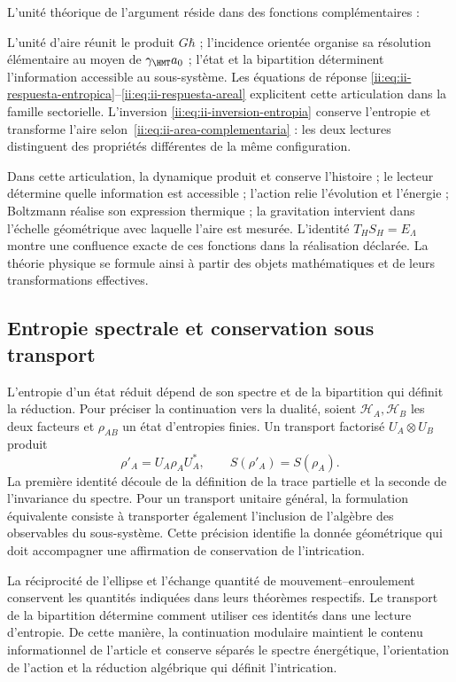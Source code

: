 L’unité théorique de l’argument réside dans des fonctions complémentaires :

L’unité d’aire réunit le produit $G\hbar$ ; l’incidence orientée
organise sa résolution élémentaire au moyen de $\gamma_{\HMT}a_0$ ;
l’état et la bipartition déterminent l’information accessible au
sous-système. Les équations de réponse
\eqref{ii:eq:ii-respuesta-entropica}--\eqref{ii:eq:ii-respuesta-areal}
explicitent cette articulation dans la famille sectorielle. L’inversion
\eqref{ii:eq:ii-inversion-entropia} conserve l’entropie et transforme
l’aire selon~\eqref{ii:eq:ii-area-complementaria} : les deux lectures
distinguent des propriétés différentes de la même configuration.

Dans cette articulation,
la dynamique produit et conserve l’histoire ; le lecteur détermine quelle
information est accessible ; l’action relie l’évolution et l’énergie ;
Boltzmann réalise son expression thermique ; la gravitation intervient
dans l’échelle géométrique avec laquelle l’aire est mesurée. L’identité
\(T_HS_H=E_\Lambda\) montre une confluence exacte de ces fonctions
dans la réalisation déclarée. La théorie physique se formule ainsi à partir
des objets mathématiques et de leurs transformations effectives.

\subsection{Entropie spectrale et conservation sous transport}

L’entropie d’un état réduit dépend de son spectre et de la
bipartition qui définit la réduction. Pour préciser la continuation
vers la dualité, soient \(\mathcal H_A,\mathcal H_B\) les deux facteurs
et \(\rho_{AB}\) un état d’entropies finies. Un transport
factorisé \(U_A\otimes U_B\) produit
\[
 \rho'_A=U_A\rho_AU_A^*,\qquad S(\rho'_A)=S(\rho_A).
\]
La première identité découle de la définition de la trace partielle et la
seconde de l’invariance du spectre. Pour un transport unitaire
général, la formulation équivalente consiste à transporter également
l’inclusion de l’algèbre des observables du sous-système. Cette précision
identifie la donnée géométrique qui doit accompagner une affirmation
de conservation de l’intrication.

La réciprocité de l’ellipse et l’échange quantité de mouvement--enroulement
conservent les quantités indiquées dans leurs théorèmes respectifs. Le
transport de la bipartition détermine comment utiliser ces identités
dans une lecture d’entropie. De cette manière, la continuation modulaire
maintient le contenu informationnel de l’article et conserve séparés
le spectre énergétique, l’orientation de l’action et la réduction
algébrique qui définit l’intrication.


